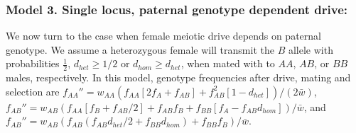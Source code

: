 \documentclass[12pt,letterpaper]{article}
\begin{document}
\subsubsection*{Model 3. Single locus, paternal genotype dependent drive:}
We now turn to the case when female meiotic drive depends on paternal genotype.
 We assume a heterozygous female will transmit the $B$ allele 
  with probabilities  $\frac{1}{2}$,  $d_{het}\geq 1/2 $ or $d_{hom}\geq d_{het}$, 
 when mated with to $AA$, $AB$, or $BB$ males,  respectively. 
  In this model, genotype frequencies after drive, mating and selection are 
  	$f_{AA}'' =   w_{AA}\left( f_{AA} [2 f_A + f_{AB} ] + f_{AB}^2 [1 - d_{het}] \right)/(2\bar{w})$,
	$f_{AB}'' =   w_{AB}(f_{AA} [f_B + f_{AB}/2] + f_{AB} f_B + f_{BB} [ f_A - f_{AB} d_{hom}])/\bar{w}$, 
	and 	$f_{AB}'' =   w_{AB}(f_{AB} (f_{AB} d_{het}/2 + f_{BB} d_{hom}) + f_{BB} f_B)/\bar{w}$. 
\end{document}
